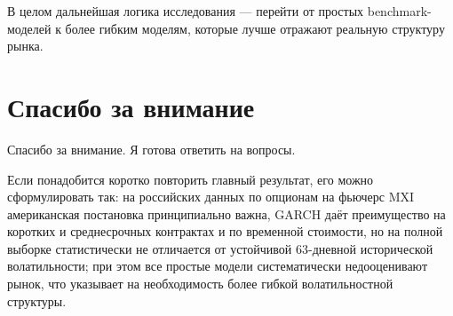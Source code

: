 \documentclass[11pt,a4paper]{article}
\newcommand{\slidetitle}[1]{\section{#1}}
\begin{document}
В целом дальнейшая логика исследования --- перейти от простых benchmark-моделей к более гибким моделям, которые лучше отражают реальную структуру рынка.

\slidetitle{Спасибо за внимание}

Спасибо за внимание. Я готова ответить на вопросы.

Если понадобится коротко повторить главный результат, его можно сформулировать так: на российских данных по опционам на фьючерс MXI американская постановка принципиально важна, GARCH даёт преимущество на коротких и среднесрочных контрактах и по временной стоимости, но на полной выборке статистически не отличается от устойчивой 63-дневной исторической волатильности; при этом все простые модели систематически недооценивают рынок, что указывает на необходимость более гибкой волатильностной структуры.
\end{document}
